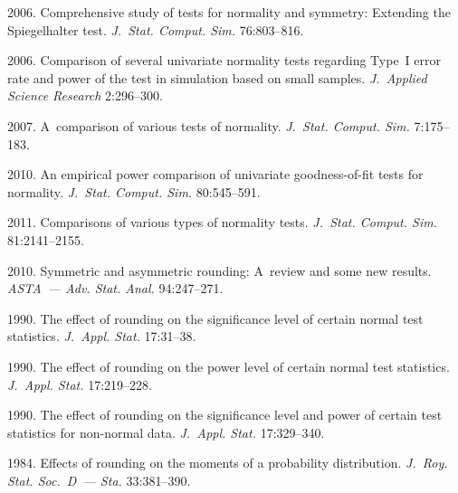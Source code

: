   \begin{multicols}{2}

\renewcommand{\bibname}{\protect\rmfamily References}

{\small\frenchspacing
 {%
 \begin{thebibliography}{99}
 2006. Comprehensive study of tests for normality and symmetry: Extending the Spiegelhalter test. \textit{J.~Stat. Comput. Sim.} 76:803--816.

 2006. Comparison of several univariate normality tests regarding Type~I error rate and power of the test in simulation based on small samples. 
 \textit{J.~Applied Science Research} 2:296--300.

 2007. A~comparison of various tests of normality. \textit{J.~Stat. Comput. Sim.} 7:175--183.

 2010. An empirical power comparison of univariate goodness-of-fit tests for normality. \textit{J.~Stat. Comput. Sim.} 80:545--591.

 2011. Comparisons of various types of normality tests. \textit{J.~Stat. Comput. Sim.} 81:2141--2155.

 2010. Symmetric and asymmetric rounding: A~review and some new results. \textit{ASTA~--- Adv. Stat. Anal.} 94:247--271.

 1990. The effect of rounding on the significance level of certain normal test statistics. \textit{J.~Appl. Stat.} 17:31--38.

 1990. The effect of rounding on the power level of certain normal test statistics. \textit{J.~Appl. Stat.} 17:219--228.

 1990. The effect of rounding on the significance level and power of certain test statistics for non-normal data. 
\textit{J.~Appl. Stat.} 17:329--340.

 1984. Effects of rounding on the moments of a probability distribution.
\textit{J.~Roy. Stat. Soc.~D~--- Sta.} 33:381--390.


\end{thebibliography}}}
\end{multicols}
